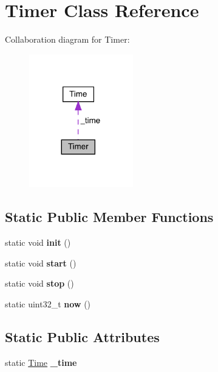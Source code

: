 \hypertarget{classTimer}{}\section{Timer Class Reference}
\label{classTimer}


Collaboration diagram for Timer\+:\nopagebreak
\begin{figure}[H]
\begin{center}
\leavevmode
\includegraphics[width=128pt]{classTimer__coll__graph}
\end{center}
\end{figure}
\subsection*{Static Public Member Functions}
\begin{DoxyCompactItemize}
\item 
\mbox{\label{classTimer_a00eca12a53538b339a927723a246e2d7}} 
static void {\bfseries init} ()
\item 
\mbox{\label{classTimer_a3a8b5272198d029779dc9302a54305a8}} 
static void {\bfseries start} ()
\item 
\mbox{\label{classTimer_a63f0eb44b27402196590a03781515dba}} 
static void {\bfseries stop} ()
\item 
\mbox{\label{classTimer_a8b32de7275bebb6ecc51385f1f1d1d43}} 
static uint32\+\_\+t {\bfseries now} ()
\end{DoxyCompactItemize}
\subsection*{Static Public Attributes}
\begin{DoxyCompactItemize}
\item 
\mbox{\label{classTimer_a831586e44562c0ea423344197dc8e529}} 
static \hyperlink{structTime}{Time} {\bfseries \+\_\+time}
\end{DoxyCompactItemize}
